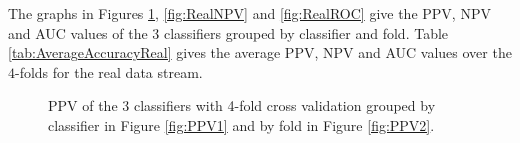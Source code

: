 \documentclass[a4paper,11pt]{article}
\begin{document}
The graphs in Figures \ref{fig:RealPPV}, \ref{fig:RealNPV} and \ref{fig:RealROC} give the PPV, NPV and AUC values of the 3 classifiers grouped by classifier and fold. Table \ref{tab:AverageAccuracyReal} gives the average PPV, NPV and AUC values over the $4$-folds for the real data stream.




\begin{figure}[H]%
	\centering
	\caption{\footnotesize PPV of the 3 classifiers with 4-fold cross validation grouped by classifier in Figure \ref{fig:PPV1} and by fold in Figure \ref{fig:PPV2}. }
	\label{fig:RealPPV}
\end{figure}
\end{document}
